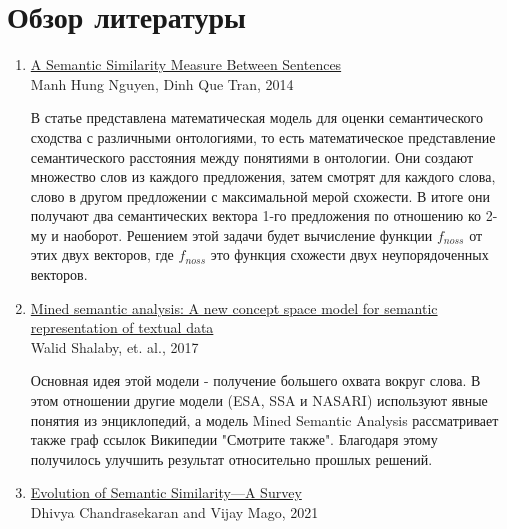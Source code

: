 \documentclass[12pt]{article}
\begin{document}
\newpage

\section{Обзор литературы}

\begin{enumerate}
	\item  \href{https://www.researchgate.net/publication/272088094_A_SEMANTIC_SIMILARITY_MEASURE_BETWEEN_SENTENCES}{A Semantic Similarity Measure Between Sentences} \\
	{\footnotesize Manh Hung Nguyen, Dinh Que Tran, 2014}
	
	В статье представлена математическая модель для оценки семантического сходства с различными онтологиями, то есть математическое представление семантического расстояния между понятиями в онтологии. Они создают множество слов из каждого предложения, затем смотрят для каждого слова, слово в другом предложении с максимальной мерой схожести. В итоге они получают два семантических вектора 1-го предложения по отношению ко 2-му и наоборот. Решением этой задачи будет вычисление функции $f_{noss}$ от этих двух векторов, где $f_{noss}$ это функция схожести двух неупорядоченных векторов.
	
	\item \href{https://www.researchgate.net/publication/322512205_Mined_semantic_analysis_A_new_concept_space_model_for_semantic_representation_of_textual_data}{Mined semantic analysis: A new concept space model for semantic representation of textual data} \\
	{\footnotesize Walid Shalaby, et. al., 2017}
	
	Основная идея этой модели - получение большего охвата вокруг слова. В этом отношении другие модели (ESA, SSA и NASARI) используют явные понятия из энциклопедий, а модель Mined Semantic Analysis рассматривает также граф ссылок Википедии "Смотрите также". Благодаря этому получилось улучшить результат относительно прошлых решений.
	
	\item \href{https://www.researchgate.net/publication/349481951_Evolution_of_Semantic_Similarity-A_Survey}{Evolution of Semantic Similarity—A Survey} \\
	{\footnotesize Dhivya Chandrasekaran and Vijay Mago, 2021}
	

\end{enumerate}
\end{document}
